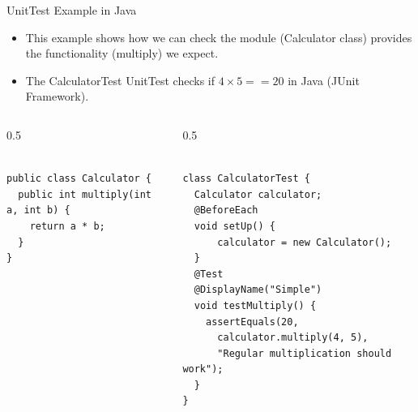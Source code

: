 \begin{frame}[fragile]{UnitTest Example in Java}

\begin{itemize}
	\item This example shows how we can check the module (Calculator class) provides the functionality (multiply) we expect. 
	\item The CalculatorTest UnitTest checks if $4 \times 5 == 20$ in Java (JUnit Framework). 
\end{itemize}

\begin{columns}%
\begin{column}{0.5\textwidth}%
\begin{Code}{}%
\begin{lstlisting}[firstnumber=1, label=glabels, xleftmargin=0pt, basicstyle=\tiny]% 

public class Calculator {
  public int multiply(int a, int b) {
    return a * b;
  }
}
\end{lstlisting}%
\end{Code}%
\end{column}%
\begin{column}{0.5\textwidth}%

\begin{Code}{}%
\begin{lstlisting}[firstnumber=1, label=glabels, xleftmargin=0pt, basicstyle=\tiny]% 

class CalculatorTest {
  Calculator calculator;
  @BeforeEach                                         
  void setUp() {
      calculator = new Calculator();
  }
  @Test                                               
  @DisplayName("Simple")
  void testMultiply() {
    assertEquals(20, 
      calculator.multiply(4, 5),     
      "Regular multiplication should work");  
  }
}  
\end{lstlisting}%
\end{Code}%

\end{column}%
\end{columns}%

\end{frame}